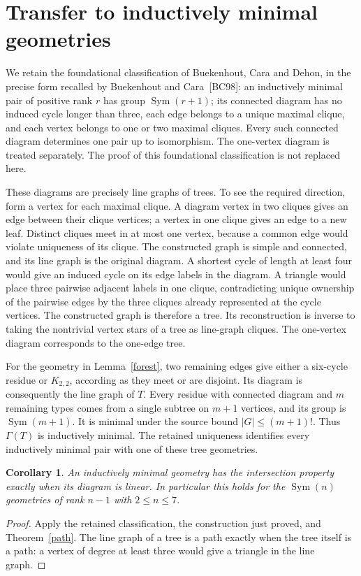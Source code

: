 \documentclass[11pt,a4paper]{article}
\newtheorem{corollary}[theorem]{Corollary}
\newcommand{\Sym}{\operatorname{Sym}}
\begin{document}
\section{Transfer to inductively minimal geometries}
We retain the foundational classification of Buekenhout, Cara and Dehon,
in the precise form recalled by Buekenhout and Cara~[BC98]: an inductively
minimal pair of positive rank $r$ has group $\Sym(r+1)$; its connected
diagram has no induced cycle longer than three, each edge belongs to a
unique maximal clique, and each vertex belongs to one or two maximal
cliques. Every such connected diagram determines one pair up to
isomorphism. The one-vertex diagram is treated separately. The proof of
this foundational classification is not replaced here.

These diagrams are precisely line graphs of trees. To see the required
direction, form a vertex for each maximal clique. A diagram vertex in
two cliques gives an edge between their clique vertices; a vertex in
one clique gives an edge to a new leaf. Distinct cliques meet in at most
one vertex, because a common edge would violate uniqueness of its
clique. The constructed graph is simple and connected, and its line
graph is the original diagram. A shortest cycle of length at least four
would give an induced cycle on its edge labels in the diagram. A triangle
would place three pairwise adjacent labels in one clique, contradicting
unique ownership of the pairwise edges by the three cliques already
represented at the cycle vertices. The constructed graph is therefore
a tree. Its reconstruction is inverse to taking the nontrivial vertex
stars of a tree as line-graph cliques. The one-vertex diagram corresponds
to the one-edge tree.

For the geometry in Lemma~\ref{forest}, two remaining edges give either
a six-cycle residue or $K_{2,2}$, according as they meet or are disjoint.
Its diagram is consequently the line graph of $T$. Every residue with
connected diagram and $m$ remaining types comes from a single subtree
on $m+1$ vertices, and its group is $\Sym(m+1)$. It is minimal under the
source bound $|G|\leq(m+1)!$. Thus $\Gamma(T)$ is inductively minimal.
The retained uniqueness identifies every inductively minimal pair with
one of these tree geometries.

\begin{corollary}
An inductively minimal geometry has the intersection property exactly
when its diagram is linear. In particular this holds for the
$\Sym(n)$ geometries of rank $n-1$ with $2\leq n\leq7$.
\end{corollary}
\begin{proof}
Apply the retained classification, the construction just proved, and
Theorem~\ref{path}. The line graph of a tree is a path exactly when the
tree itself is a path: a vertex of degree at least three would give a
triangle in the line graph.
\end{proof}
\end{document}
